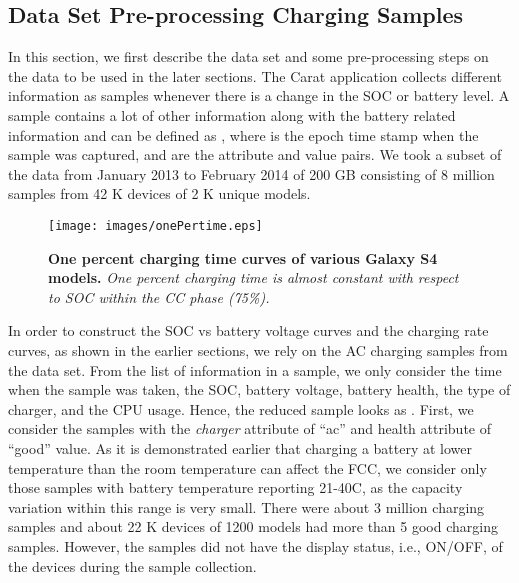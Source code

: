 \documentclass[journal]{IEEEtran}
\begin{document}
\subsection{Data Set  Pre-processing Charging Samples}In this section, we first describe the data set and some pre-processing steps on the data to be used in the later sections. The Carat application collects different information as samples whenever there is a change in the SOC or battery level. A sample contains a lot of other information along with the battery related information and can be defined as , where  is the epoch time stamp when the sample was captured, and   are the attribute and value pairs. We took a subset of the data from January 2013 to February 2014 of 200 GB  consisting of 8 million samples from 42 K devices of 2 K unique models. 






\begin{figure}[t]
  \begin{center}
  \texttt{[image: images/onePertime.eps]}
  
    \caption{{\bf One percent charging time curves of various Galaxy S4 models. }{\sl One percent charging time is almost constant with respect to SOC within the CC phase (75\%).}}
    \label{fig:onePercurve}
 \end{center}
 \end{figure}



In order to construct the SOC vs battery voltage curves and the charging rate curves, as shown in the earlier sections, we rely on the AC charging samples from the data set. From the list of information in a sample, we only consider the time when the sample was taken, the SOC, battery voltage, battery health, the type of charger, and the CPU usage. Hence, the reduced sample looks as  . First, we consider the samples with the \textit{charger} attribute of ``ac'' and health attribute of ``good'' value. As it is demonstrated earlier that charging a battery at lower temperature than the room temperature can affect the FCC,  we  consider  only those  samples with battery temperature reporting 21-40C, as the capacity variation within  this  range  is  very  small. There were about 3 million charging samples and about 22 K devices of 1200 models had more than 5 good charging samples. However, the samples did not have the display status, i.e., ON/OFF, of the devices during the sample collection.
\end{document}

